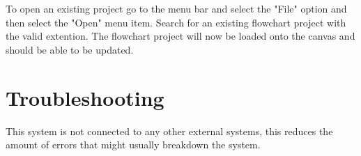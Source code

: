 \documentclass[11pt,a4paper,titlepage]{article}
\begin{document}
	To open an existing project go to the menu bar and select the "File" option and then select the "Open" menu item. Search for an existing flowchart project with the valid extention. The flowchart project will now be loaded onto the canvas and should be able to be updated.
	
\section{Troubleshooting}

This system is not connected to any other external systems, this reduces the amount of errors that might usually breakdown the system.
\end{document}
